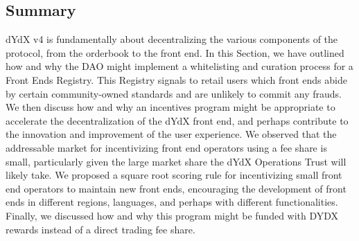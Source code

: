    \subsection{Summary} \label{subsec:summary_feip}

        dYdX v4 is fundamentally about decentralizing the various components of the protocol, from the orderbook to the front end. In this Section, we have outlined how and why the DAO might implement a whitelisting and curation process for a Front Ends Registry. This Registry signals to retail users which front ends abide by certain community-owned standards and are unlikely to commit any frauds. We then discuss how and why an incentives program might be appropriate to accelerate the decentralization of the dYdX front end, and perhaps contribute to the innovation and improvement of the user experience. We observed that the addressable market for incentivizing front end operators using a fee share is small, particularly given the large market share the dYdX Operations Trust will likely take. We proposed a square root scoring rule for incentivizing small front end operators to maintain new front ends, encouraging the development of front ends in different regions, languages, and perhaps with different functionalities. Finally, we discussed how and why this program might be funded with DYDX rewards instead of a direct trading fee share.